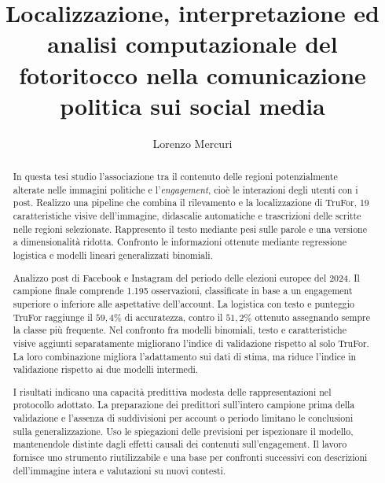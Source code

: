\documentclass[oneside, noexaminfo]{sapthesis}
\title{Localizzazione, interpretazione ed analisi computazionale del fotoritocco nella comunicazione politica sui social media}
\author{Lorenzo Mercuri}
\begin{document}
\frontmatter
\hypersetup{pageanchor=false}
\maketitle
\hypersetup{pageanchor=true}


\begin{abstract}
In questa tesi studio l'associazione tra il contenuto delle regioni potenzialmente alterate nelle immagini politiche e l'\emph{engagement}, cioè le interazioni degli utenti con i post. Realizzo una pipeline che combina il rilevamento e la localizzazione di TruFor, 19 caratteristiche visive dell'immagine, didascalie automatiche e trascrizioni delle scritte nelle regioni selezionate. Rappresento il testo mediante pesi sulle parole e una versione a dimensionalità ridotta. Confronto le informazioni ottenute mediante regressione logistica e modelli lineari generalizzati binomiali.

Analizzo post di Facebook e Instagram del periodo delle elezioni europee del 2024. Il campione finale comprende 1.195 osservazioni, classificate in base a un engagement superiore o inferiore alle aspettative dell'account. La logistica con testo e punteggio TruFor raggiunge il $59{,}4\%$ di accuratezza, contro il $51{,}2\%$ ottenuto assegnando sempre la classe più frequente. Nel confronto fra modelli binomiali, testo e caratteristiche visive aggiunti separatamente migliorano l'indice di validazione rispetto al solo TruFor. La loro combinazione migliora l'adattamento sui dati di stima, ma riduce l'indice in validazione rispetto ai due modelli intermedi.

I risultati indicano una capacità predittiva modesta delle rappresentazioni nel protocollo adottato. La preparazione dei predittori sull'intero campione prima della validazione e l'assenza di suddivisioni per account o periodo limitano le conclusioni sulla generalizzazione. Uso le spiegazioni delle previsioni per ispezionare il modello, mantenendole distinte dagli effetti causali dei contenuti sull'engagement. Il lavoro fornisce uno strumento riutilizzabile e una base per confronti successivi con descrizioni dell'immagine intera e valutazioni su nuovi contesti.
\end{abstract}

\tableofcontents

\mainmatter









\backmatter

\cleardoublepage
{}
{}



\end{document}
